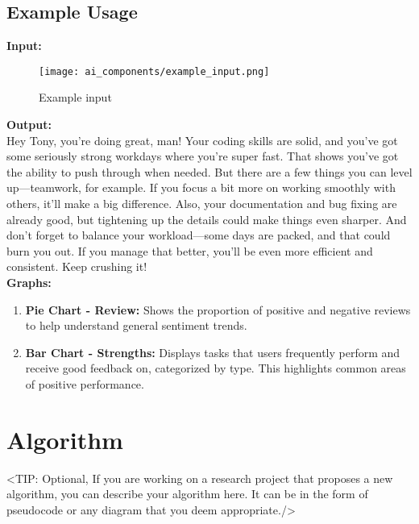 \begin{itemize}
    \subsection{Example Usage}
    \textbf{Input:}
    \begin{figure}[H]
        \centering
        \texttt{[image: ai\_components/example\_input.png]}
        \caption{Example input}
    \end{figure}
    \textbf{Output:} \\
     Hey Tony, you're doing great, man! Your coding skills are solid, and you’ve got some seriously strong workdays where you’re super fast. That shows you’ve got the ability to push through when needed. But there are a few things you can level up—teamwork, for example. If you focus a bit more on working smoothly with others, it’ll make a big difference. Also, your documentation and bug fixing are already good, but tightening up the details could make things even sharper. And don’t forget to balance your workload—some days are packed, and that could burn you out. If you manage that better, you’ll be even more efficient and consistent. Keep crushing it! \\
    \textbf{Graphs:}  
    \begin{enumerate}
        \item \textbf{Pie Chart - Review:} Shows the proportion of positive and negative reviews to help understand general sentiment trends.  
        \item \textbf{Bar Chart - Strengths:} Displays tasks that users frequently perform and receive good feedback on, categorized by type. This highlights common areas of positive performance.  
    \end{enumerate}
\end{itemize}

\section{Algorithm}
\label{section:algorithm}
<TIP: Optional, If you are working on a research project that proposes a new
algorithm, you can describe your algorithm here. It can be in the form of
pseudocode or any diagram that you deem appropriate./>